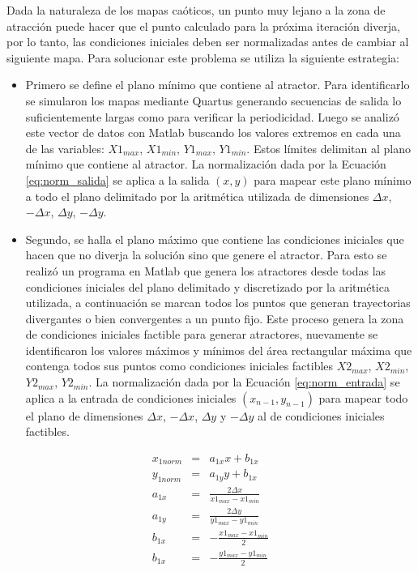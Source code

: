 Dada la naturaleza de los mapas caóticos, un punto muy lejano a la zona de atracción puede hacer que el punto calculado para la próxima iteración diverja, por lo tanto, las condiciones iniciales deben ser normalizadas antes de cambiar al siguiente mapa.
Para solucionar este problema se utiliza la siguiente estrategia:
\begin{itemize}
	\item Primero se define el plano mínimo que contiene al atractor.
	Para identificarlo se simularon los mapas mediante Quartus generando secuencias de salida lo suficientemente largas como para verificar la periodicidad.
	Luego se analizó este vector de datos con Matlab buscando los valores extremos en cada una de las variables: $X1_{max}$, $X1_{min}$, $Y1_{max}$, $Y1_{min}$.
	Estos límites delimitan al plano mínimo que contiene al atractor.
	La normalización dada por la Ecuación \ref{eq:norm_salida} se aplica a la salida $\left(x,y\right)$ para mapear este plano mínimo a todo el plano delimitado por la aritmética utilizada de dimensiones $\Delta x$, $-\Delta x$, $\Delta y$, $-\Delta y$.
	\item Segundo, se halla el plano máximo que contiene las condiciones iniciales que hacen que no diverja la solución sino que genere el atractor.
	Para esto se realizó un programa en Matlab que genera los atractores desde todas las condiciones iniciales del plano delimitado y discretizado por la aritmética utilizada, a continuación se marcan todos los puntos que generan trayectorias divergantes o bien convergentes a un punto fijo. 
	Este proceso genera la zona de condiciones iniciales factible para generar atractores, nuevamente se identificaron los valores máximos y mínimos del área rectangular máxima que contenga todos sus puntos como condiciones iniciales factibles $X2_{max}$, $X2_{min}$, $Y2_{max}$, $Y2_{min}$. 
	La normalización dada por la Ecuación \ref{eq:norm_entrada} se aplica a la entrada de condiciones iniciales $\left(x_{n-1},y_{n-1}\right)$ para mapear todo el plano de dimensiones $\Delta x$, $-\Delta x$, $\Delta y$ y $-\Delta y$ al de condiciones iniciales factibles.
\end{itemize}
%
\begin{eqnarray}\label{eq:norm_salida}
x_{1norm}&=& a_{1x} x+b_{1x} \nonumber\\
y_{1norm}&=& a_{1y} y+b_{1x} \nonumber\\
a_{1x}&=& \frac{2\Delta x}{x1_{max}-x1_{min}} \nonumber\\
a_{1y}&=& \frac{2\Delta y}{y1_{max}-y1_{min}} \nonumber\\
b_{1x}&=& -\frac{x1_{max}-x1_{min}}{2} \nonumber\\
b_{1x}&=& -\frac{y1_{max}-y1_{min}}{2}
\end{eqnarray}
